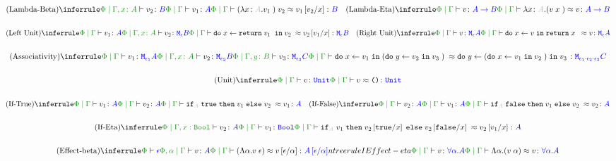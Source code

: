 \documentclass{report}
\begin{document}
    \begin{framed}
        \[
            \scalebox{0.8}{$
            \ntreeruleII{Lambda-Beta}{\etyperelation{\P}{\gax}{v_2}{B}}{\gpetyperelation{v_1}{A}}{\gpeberelation{\apply{(\lam{x}{A}{v_1})}{v_2} }{ v_1\ssub{x}{v_2}}{B}}
            \quad
            \ntreeruleI{Lambda-Eta}{\gpetyperelation{v}{\ab}}{\gpeberelation{\lam{x}{A}{(\apply{v}{x}})}{v}{\ab}}
            $}
        \]
    
        \[\scalebox{0.8}{$
            \ntreeruleII{Left Unit}{\gpetyperelation{v_1}{A} }{ \etyperelation{\P}{\gax}{v_2}{\meb}}{\gpeberelation{\doin{x}{\return{v_1}}{v_2}}{v_2\ssub{x}{v_1}}{\meb}}
            \quad
            \ntreeruleI{Right Unit}{\gpetyperelation{v}{\mea}}{\gpeberelation{\doin{x}{v}{\return{x}} }{v}{\mea}}
        $}\]
    
        \[\scalebox{0.8}{$
            \ntreeruleIII{Associativity}{\gpetyperelation{v_1}{\M{\e_1}{A}} }{\etyperelation{\P}{\gax}{v_2}{\M{\e_2}{B}}}{ \etyperelation{\P}{\gby}{v_3}{\M{\e_3}{C}}}{
                \gpeberelation{\doin{x}{v_1}{(\doin{y}{v_2}{v_3})}}{\doin{y}{(\doin{x}{v_1}{v_2})}{v_3}}{\M{\e_1 \dot \e_2 \dot \e_3}{C}}
            }
        $}\]
    
        \[\scalebox{0.8}{$
            \ntreeruleI{Unit}{\gpetyperelation{v}{\U}}{\gpeberelation{v}{\u}{\U}}
        $}\]
    
        \[\scalebox{0.8}{$
            \ntreeruleII{If-True}{\gpetyperelation{v_1}{A}}{\gpetyperelation{v_2}{A}}{\gpeberelation{\pifthenelse{A}{\t}{v_1}{v_2}}{v_1}{A}}
            \quad
            \ntreeruleII{If-False}{\gpetyperelation{v_2}{A}}{\gpetyperelation{v_1}{A}}{\gpeberelation{\pifthenelse{A}{\f}{v_1}{v_2}}{v_2}{A}}    
        $}\]
    
        \[\scalebox{0.8}{$
            \ntreeruleII{If-Eta}{\etyperelation{\P}{\G, x: \B}{v_2}{A}}{\gpetyperelation{v_1}{\B}}{\gpeberelation{\pifthenelse{A}{v_1}{v_2\ssub{x}{\t}}{v_2\ssub{x}{\f}}}{v_2\ssub{x}{v_1}}{A}}
        $}\]
    
        \[\scalebox{0.8}{$
            \ntreeruleII{Effect-beta}{\wellformed{\P}{\e}}{\etyperelation{\P, \a}{\G}{v}{A}}{\gpeberelation{\eapp{(\elam{\a}{v}}{\e})}{v\ssub{\a}{\e}}{A\ssub{\a}{\e}}}
            \quad 
            \\ntreeruleI{Effect-eta}{\etyperelation{\P}{\G}{v}{\all{\a}{A}}}{\gpeberelation{\elam{\a}{(\eapp{v}{\a})}}{v}{\all{\a}{A}}}
        $}\]
    \end{framed}
\end{document}
